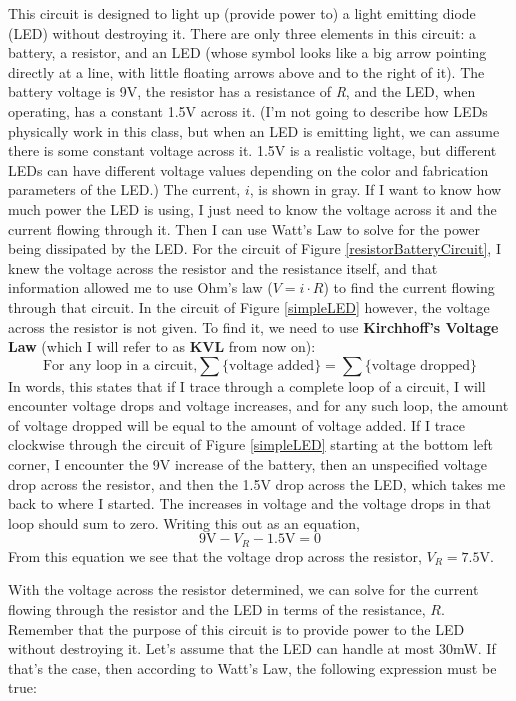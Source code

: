 This circuit is designed to light up (provide power to) a light emitting diode (LED) without destroying it. There are only three elements in this circuit: a battery, a resistor, and an LED (whose symbol looks like a big arrow pointing directly at a line, with little floating arrows above and to the right of it). The battery voltage is 9V, the resistor has a resistance of \textit{R}, and the LED, when operating, has a constant 1.5V across it. (I'm not going to describe how LEDs physically work in this class, but when an LED is emitting light, we can assume there is some constant voltage across it. 1.5V is a realistic voltage, but different LEDs can have different voltage values depending on the color and fabrication parameters of the LED.) The current, $i$, is shown in gray.  If I want to know how much power the LED is using, I just need to know the voltage across it and the current flowing through it. Then I can use Watt's Law to solve for the power being dissipated by the LED. For the circuit of Figure \ref{resistorBatteryCircuit}, I knew the voltage across the resistor and the resistance itself, and that information allowed me to use Ohm's law ($V=i \cdot R$) to find the current flowing through that circuit. In the circuit of Figure \ref{simpleLED} however, the voltage across the resistor is not given. To find it, we need to use \textbf{Kirchhoff's Voltage Law} (which I will refer to as \textbf{KVL} from now on):
$$
\textrm{For any loop in a circuit,} \sum\textrm{\{voltage added\}} = \sum\textrm{\{voltage dropped\}}
$$
In words, this states that if I trace through a complete loop of a circuit, I will encounter voltage drops and voltage increases, and for any such loop, the amount of voltage dropped will be equal to the amount of voltage added. If I trace clockwise through the circuit of Figure \ref{simpleLED} starting at the bottom left corner, I encounter the 9V increase of the battery, then an unspecified voltage drop across the resistor, and then the 1.5V drop across the LED, which takes me back to where I started. The increases in voltage and the voltage drops in that loop should sum to zero. Writing this out as an equation,
$$
9\textrm{V} - V_R - 1.5\textrm{V} = 0
$$
From this equation we see that the voltage drop across the resistor, $V_R = 7.5\textrm{V}$.
\par
With the voltage across the resistor determined, we can solve for the current flowing through the resistor and the LED in terms of the resistance, $R$. Remember that the purpose of this circuit is to provide power to the LED without destroying it. Let's assume that the LED can handle at most 30mW. If that's the case, then according to Watt's Law, the following expression must be true:
